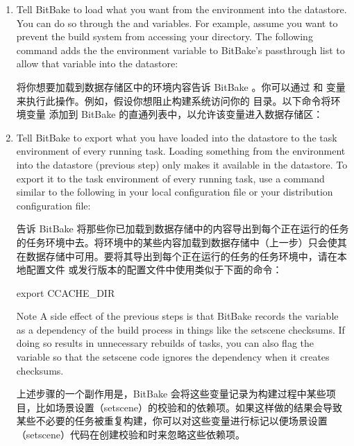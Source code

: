 \begin{enumerate}
\setlength\itemsep{1.0em}
\item Tell BitBake to load what you want from the environment into the datastore. You can do so through the\linebreak {} and  variables. For example, assume you want to prevent the build system from accessing your  directory. The following command adds the the environment variable  to BitBake's passthrough list to allow that variable into the datastore:

\medskip
将你想要加载到数据存储区中的环境内容告诉 BitBake 。你可以通过  和\linebreak {} 变量来执行此操作。例如，假设你想阻止构建系统访问你的  目录。以下命令将环境变量  添加到 BitBake 的直通列表中，以允许该变量进入数据存储区：


\item Tell BitBake to export what you have loaded into the datastore to the task environment of every running task. Loading something from the environment into the datastore (previous step) only makes it available in the datastore. To export it to the task environment of every running task, use a command similar to the following in your local configuration file  or your distribution configuration file:

\medskip
告诉 BitBake 将那些你已加载到数据存储中的内容导出到每个正在运行的任务的任务环境中去。将环境中的某些内容加载到数据存储中（上一步）只会使其在数据存储中可用。要将其导出到每个正在运行的任务的任务环境中，请在本地配置文件  或发行版本的配置文件中使用类似于下面的命令：

\begin{pyglist}
export CCACHE_DIR
\end{pyglist}

\medskip
\begin{noteblock}{Note}%
A side effect of the previous steps is that BitBake records the variable as a dependency of the build process in things like the setscene checksums. If doing so results in unnecessary rebuilds of tasks, you can also flag the variable so that the setscene code ignores the dependency when it creates checksums.

\medskip
上述步骤的一个副作用是，BitBake 会将这些变量记录为构建过程中某些项目，比如场景设置（setscene）的校验和的依赖项。如果这样做的结果会导致某些不必要的任务被重复构建，你可以对这些变量进行标记以便场景设置（setscene）代码在创建校验和时来忽略这些依赖项。
\end{noteblock}
\end{enumerate}

